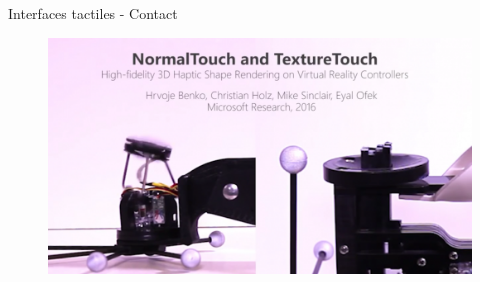 \documentclass[compress, noflama]{beamer}
\begin{document}
{
\begin{frame}{Interfaces tactiles - Contact}
\begin{figure}
\href{run:videos/microsoft_texture.mp4}{\includegraphics[width=\linewidth]{images/microsoft_textureTouch}}
\end{figure}

\end{frame}
}
\end{document}
